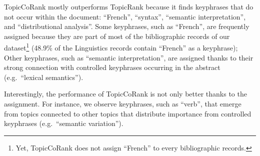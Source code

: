     TopicCoRank mostly outperforms TopicRank because it finds key\-phrases that do not occur within the document: ``French'', ``syntax'', ``semantic interpretation'', and ``distributional analysis''.
    Some keyphrases, such as ``French'', are frequently assigned because they are part of most of the bibliographic records of our dataset\footnote{Yet, TopicCoRank does not assign ``French'' to every bibliographic records.} (48.9\% of the Linguistics records contain ``French'' as a keyphrase);
    Other keyphrases, such as ``semantic interpretation'', are assigned thanks to their strong connection with controlled keyphrases occurring in the abstract (e.g.~``lexical semantics'').

    Interestingly, the performance of TopicCoRank is not only better thanks to the assignment.
    For instance, we observe keyphrases, such as ``verb'', that emerge from topics connected to other topics that distribute importance from controlled keyphrases (e.g.~``semantic variation'').
